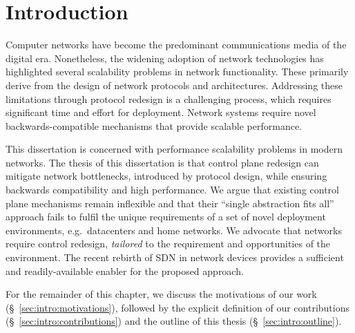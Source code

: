 \chapter{Introduction} \label{s:introduction:introduction}

Computer networks have become the predominant communications media of the
digital era. Nonetheless, the widening adoption of network technologies has
highlighted several scalability problems in network functionality. These
primarily derive from the design of network protocols and architectures.
Addressing these limitations through protocol redesign is a challenging process,
which requires significant time and effort for deployment. Network systems
require novel backwards-compatible mechanisms that provide scalable performance. 

This dissertation is concerned with performance scalability problems in modern
networks.  The thesis of this dissertation is that control plane redesign can
mitigate network bottlenecks, introduced by protocol design, while ensuring
backwards compatibility and high performance. We argue that existing control
plane mechanisms remain inflexible and that their ``single abstraction fits all''
approach fails to fulfil the unique requirements of a set of novel deployment
environments, e.g.~datacenters and home networks.  We advocate that
networks require control redesign, \textit{tailored} to the requirement and
opportunities of  the environment. The recent rebirth of SDN in network devices
provides a sufficient and readily-available enabler for the proposed approach. 

For the remainder of this chapter, we discuss the motivations of our work
(\S~\ref{sec:intro:motivations}), followed by the explicit definition of our
contributions (\S~\ref{sec:intro:contributions}) and  the outline of this thesis
(\S~\ref{sec:intro:outline}).



